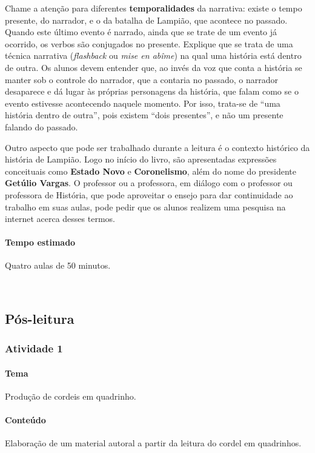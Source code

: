 \documentclass[11pt]{extarticle}
\begin{document}
Chame a atenção para diferentes \textbf{temporalidades} da narrativa: existe o tempo presente, do narrador,
e o da batalha de Lampião, que acontece no passado. Quando este último evento é narrado, ainda que 
se trate de um evento já ocorrido, os verbos são conjugados no presente. 
Explique que se trata de uma técnica narrativa (\textit{flashback} ou \textit{mise en abîme}) na qual uma história
está dentro de outra. Os alunos devem entender que, ao invés da voz que conta a história se manter 
sob o controle do narrador, que a contaria no passado, o narrador desaparece e dá lugar às próprias 
personagens da história, que falam como se o evento estivesse acontecendo naquele momento. 
Por isso, trata-se de ``uma história dentro de outra'', pois existem ``dois presentes'', e não
um presente falando do passado. 

Outro aspecto que pode ser trabalhado durante a leitura é o contexto histórico da história de Lampião. Logo no início do livro, são apresentadas expressões conceituais como \textbf{Estado Novo} e \textbf{Coronelismo}, além do nome do presidente \textbf{Getúlio Vargas}. O professor ou a professora, em diálogo com o professor ou professora
de História, que pode aproveitar o ensejo para dar continuidade ao trabalho em suas aulas,
pode pedir que os alunos realizem uma pesquisa na internet acerca desses termos.


\paragraph{Tempo estimado} Quatro aulas de 50 minutos.

 
\subsection{Pós-leitura}

\subsubsection{Atividade 1}


\paragraph{Tema} Produção de cordeis em quadrinho.

\paragraph{Conteúdo} Elaboração de um material autoral a partir da leitura
do cordel em quadrinhos.
\end{document}

